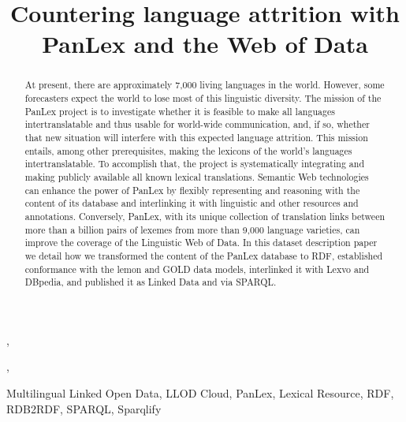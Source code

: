 \documentclass[sw]{iosart2c}
\begin{document}
\begin{frontmatter} 
\title{Countering language attrition with PanLex and the Web of Data}


\author[A]{ },
\author[A]{ },
\author[B]{ }
\address[A]{University of Leipzig, \{pwestphal, cstadler\}@informatik.uni-leipzig.de}
\address[B]{The Long Now Foundation, San Francisco, pool@panlex.org}


\begin{abstract}
At present, there are approximately 7,000 living languages in the world.
However, some forecasters expect the world to lose most of this linguistic diversity.
The mission of the PanLex project is to investigate whether it is feasible to make all languages intertranslatable and thus usable for world-wide communication, and, if so, whether that new situation will interfere with this expected language attrition.
This mission entails, among other prerequisites, making the lexicons of the world's languages intertranslatable. To accomplish that, the project is systematically integrating and making publicly available all known lexical translations.
Semantic Web technologies can enhance the power of PanLex by flexibly representing and reasoning with the content of its database and interlinking it with linguistic and other resources and annotations.
Conversely, PanLex, with its unique collection of translation links between more than a billion pairs of lexemes from more than 9,000 language varieties, can improve the coverage of the Linguistic Web of Data.
In this dataset description paper we detail how we transformed the content of the PanLex database to RDF,
established conformance with the lemon and GOLD data models,
interlinked it with Lexvo and DBpedia, and published it as Linked Data and via
SPARQL.
\end{abstract}

\begin{keyword}
Multilingual Linked Open Data, LLOD Cloud, PanLex, Lexical Resource, RDF, RDB2RDF, SPARQL, Sparqlify
\end{keyword}
\end{frontmatter}
\end{document}
